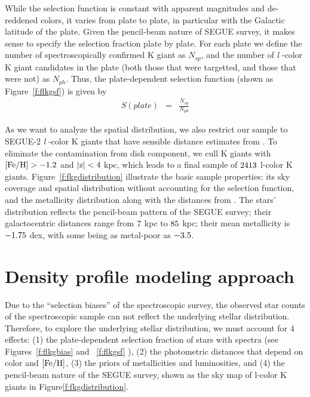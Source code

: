\documentclass[12pt,preprint]{aastex}
\newcommand{\feh}{{\rm [Fe/H]}}
\begin{document}
While the selection function is constant with apparent magnitudes and de-reddened colors, it varies from plate to plate, in particular with the Galactic latitude of the plate.   Given the pencil-beam nature of SEGUE survey, it makes sense to specify the selection fraction plate by plate. 
 For each plate we define the number of spectroscopically confirmed K giant as $N_{sp}$, and the number of \textit{l} -color K giant candidates in the plate (both those that were targetted, and those that were not) as $N_{ph}$. Thus, the plate-dependent selection function (shown as Figure~\ref{f:flkgsf}) is given by
\begin{eqnarray}
S(plate) &=& \frac{N_{sp}}{N_{ph}}   
 \end{eqnarray}

As we want to analyze the spatial distribution, we also restrict our sample to SEGUE-2 
\textit{l} -color K giants that have sensible distance estimates from \citet{Xue2014}. To eliminate the contamination from disk
component, we cull K giants with $\rm \feh>-1.2$ and $\rm |z|<4~$kpc, which leads to a final sample of $\rm 2413$
l-color K giants. Figure~\ref{f:fkgdistribution} illustrate the basic sample properties:  its sky coverage and spatial 
distribution without accounting for the selection function, and the metallicity distribution along with the distances
from \citet{Xue2014}.  The stars' distribution reflects the pencil-beam pattern of the SEGUE survey; their galactocentric
distances range  from $\rm 7~$kpc to $\rm 85~$kpc; their mean metallicity is $\rm -1.75~$dex, with some being 
as metal-poor as $\rm -3.5$. 




\section{Density profile modeling approach}
Due to the ``selection biases'' of the spectroscopic survey, the observed star counts of the spectroscopic sample can not reflect the underlying stellar distribution. Therefore, to explore the underlying stellar distribution, we must account for 4 effects: (1) the plate-dependent selection fraction of stars with spectra (see Figures~\ref{f:flkgbias} and ~\ref{f:flkgsf} ), (2) the photometric distances that depend on color and $\rm \feh$, (3) the priors of metallicities and luminosities, and (4) the pencil-beam nature of the SEGUE survey, shown as the sky map of l-color K giants in Figure\ref{f:fkgdistribution}. 
\end{document}
